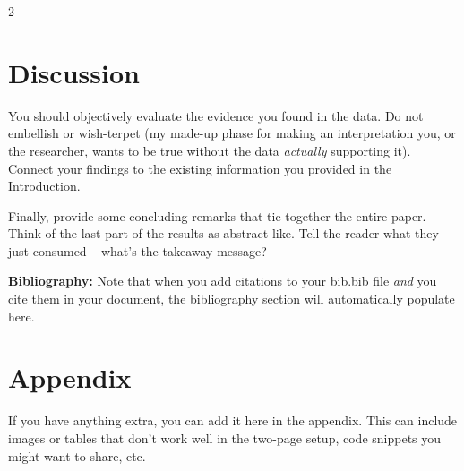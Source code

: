 \documentclass{article}\usepackage[]{graphicx}\usepackage[]{xcolor}
\begin{document}
\begin{multicols}{2}
\section{Discussion}
 You should objectively evaluate the evidence you found in the data. Do not embellish or wish-terpet (my made-up phase for making an interpretation you, or the researcher, wants to be true without the data \emph{actually} supporting it). Connect your findings to the existing information you provided in the Introduction.

Finally, provide some concluding remarks that tie together the entire paper. Think of the last part of the results as abstract-like. Tell the reader what they just consumed -- what's the takeaway message?

\vspace{2em}

\noindent\textbf{Bibliography:} Note that when you add citations to your bib.bib file \emph{and}
you cite them in your document, the bibliography section will automatically populate here.

\begin{tiny}

\end{tiny}
\end{multicols}

\newpage
\onecolumn
\section{Appendix}

If you have anything extra, you can add it here in the appendix. This can include images or tables that don't work well in the two-page setup, code snippets you might want to share, etc.
\end{document}
